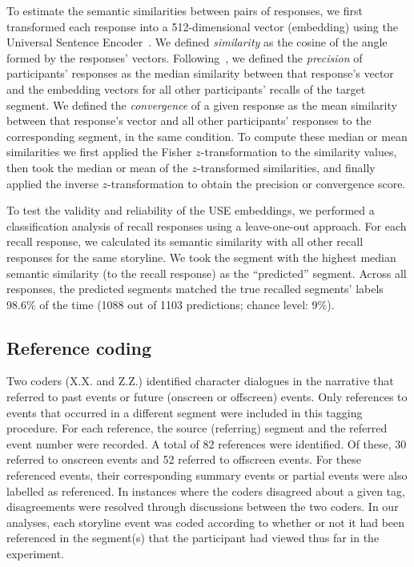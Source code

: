 \documentclass[10pt]{article}
\begin{document}
To estimate the semantic similarities between pairs of responses, we first transformed each response into a 512-dimensional vector (embedding) using the Universal Sentence Encoder~\citep[Transformer USE, ][]{CerEtal18}.  We defined \textit{similarity} as the cosine of the angle formed by the responses' vectors.  Following~\cite{HeusEtal21}, we defined the \textit{precision} of participants' responses as the median similarity between that response's vector and the embedding vectors for all other participants' recalls of the target segment.  We defined the \textit{convergence} of a given response as the mean similarity between that response's vector and all other participants' responses to the corresponding segment, in the same condition.  To compute these median or mean similarities we first applied the Fisher $z$-transformation to the similarity values, then took the median or mean of the $z$-transformed similarities, and finally applied the inverse $z$-transformation to obtain the precision or convergence score.

To test the validity and reliability of the USE embeddings, we performed a classification analysis of recall responses using a leave-one-out approach. For each recall response, we calculated its semantic similarity with all other recall responses for the same storyline.  We took the segment with the highest median semantic similarity (to the recall response) as the ``predicted'' segment.  Across all responses, the predicted segments matched the true recalled segments' labels 98.6\% of the time (1088 out of 1103 predictions; chance level: 9\%).

\subsection*{Reference coding}
Two coders (X.X. and Z.Z.) identified character dialogues in the narrative that referred to past events or future (onscreen or offscreen) events.  Only references to events that occurred in a different segment were included in this tagging procedure.  For each reference, the source (referring) segment and the referred event number were recorded. A total of 82 references were identified.  Of these, 30 referred to onscreen events and 52 referred to offscreen events. For these referenced events, their corresponding summary events or partial events were also labelled as referenced. In instances where the coders disagreed about a given tag, disagreements were resolved through discussions between the two coders.  In our analyses, each storyline event was coded according to whether or not it had been referenced in the segment(s) that the participant had viewed thus far in the experiment.
\end{document}
